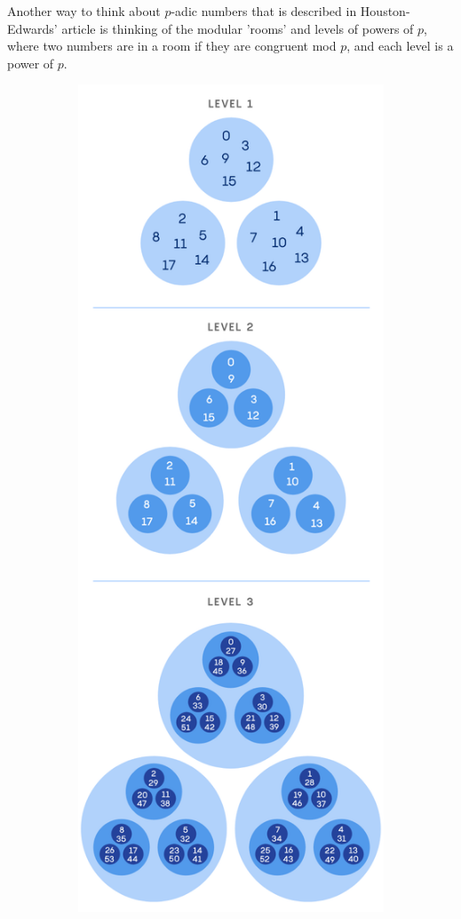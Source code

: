\documentclass[11pt]{article}
\newcommand{\padic}{$p$-adic }
\begin{document}
Another way to think about \padic numbers that is described in Houston-Edwards' article \cite{quant} is thinking of the modular 'rooms' and levels of powers of $p$, where two numbers are in a room if they are congruent mod $p$, and each level is a power of $p$.
\begin{figure}[h!]
  \centering
  \begin{subfigure}{0.29\textwidth}
    \centering
    \includegraphics[height=.2\textheight,trim={2.5cm 30cm 2.5cm 1.2cm},clip]{levels.png}

\end{subfigure}
\end{figure}
\end{document}
